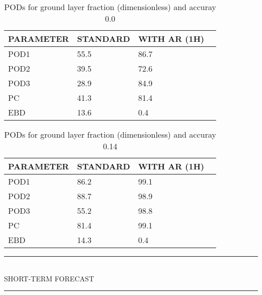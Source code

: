 \documentclass[11pt,english]{article}
\newcommand{\HRule}{\rule{\linewidth}{0.5mm}}
\begin{document}
\begin{table}[]
\begin{center}
\begin{tabular}{|l|l|l|l|}
\hline
\multicolumn{1}{|c|}{\cellcolor[HTML]{C0C0C0}\textbf{PARAMETER}} & \multicolumn{1}{c|}{\cellcolor[HTML]{C0C0C0}\textbf{STANDARD}} & \multicolumn{1}{c|}{\cellcolor[HTML]{C0C0C0}\textbf{WITH AR (1H)}} \\
\hline
\cellcolor[HTML]{C0C0C0}POD1  & 55.5                                & 86.7         \\
\cellcolor[HTML]{C0C0C0}POD2  & 39.5                                & 72.6         \\
\cellcolor[HTML]{C0C0C0}POD3  & 28.9                                & 84.9         \\
\cellcolor[HTML]{C0C0C0}PC    & 41.3                                  & 81.4           \\
\cellcolor[HTML]{C0C0C0}EBD   & 13.6                                 & 0.4          \\
\hline
\end{tabular}
\caption{PODs for ground layer fraction (dimensionless) and accuray 0.0}
\end{center}
\end{table}
\begin{table}[]
\begin{center}
\begin{tabular}{|l|l|l|l|}
\hline
\multicolumn{1}{|c|}{\cellcolor[HTML]{C0C0C0}\textbf{PARAMETER}} & \multicolumn{1}{c|}{\cellcolor[HTML]{C0C0C0}\textbf{STANDARD}} & \multicolumn{1}{c|}{\cellcolor[HTML]{C0C0C0}\textbf{WITH AR (1H)}} \\
\hline
\cellcolor[HTML]{C0C0C0}POD1  & 86.2                                & 99.1         \\
\cellcolor[HTML]{C0C0C0}POD2  & 88.7                                & 98.9         \\
\cellcolor[HTML]{C0C0C0}POD3  & 55.2                                & 98.8         \\
\cellcolor[HTML]{C0C0C0}PC    & 81.4                                  & 99.1           \\
\cellcolor[HTML]{C0C0C0}EBD   & 14.3                                 & 0.4          \\
\hline
\end{tabular}
\caption{PODs for ground layer fraction (dimensionless) and accuray 0.14}
\end{center}
\end{table}
\clearpage
\begin{center}
\HRule \\[0.4cm]
SHORT-TERM FORECAST
\HRule \\[0.4cm]
\end{center}
\end{document}
